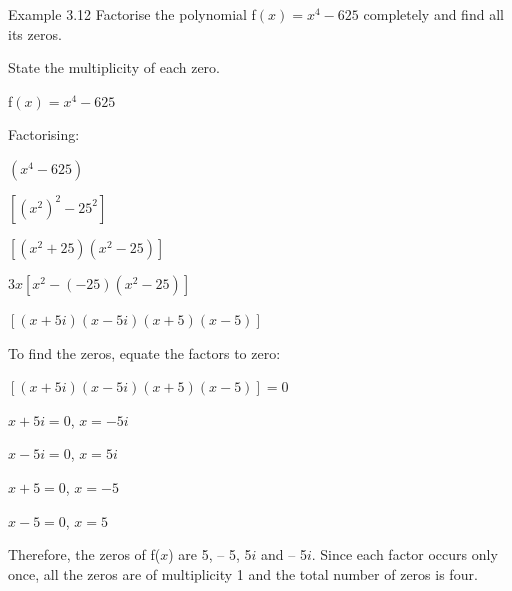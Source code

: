 \begin{example}{Example 3.12}
Factorise the polynomial f$(x) = x^4 - 625$ completely and find all its zeros.

State the multiplicity of each zero.

\solution
f$(x) = x^4 - 625$

Factorising:

$(x^4 - 625)$

$[(x^2)^2 - 25^2]$

$[(x^2 + 25)(x^2 - 25)]$

$3x[x^2 - (-25)(x^2 - 25)]$

$[(x + 5i)(x - 5i)(x + 5)(x - 5)]$

To find the zeros, equate the factors to zero:

$[(x + 5i)(x - 5i)(x + 5)(x - 5)] = 0$

$x + 5i = 0$, $x = -5i$

$x - 5i = 0$, $x = 5i$

$x + 5 = 0$, $x = -5$

$x - 5 = 0$, $x = 5$

Therefore, the zeros of f($x$) are 5, -- 5, 5$i$ and -- 5$i$. Since each factor occurs
only once, all the zeros are of multiplicity 1 and the total number of zeros is four.
\end{example}

